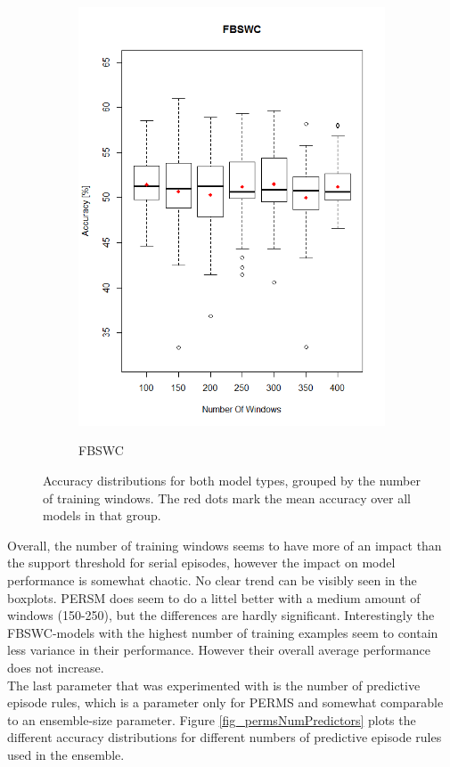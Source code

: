 \begin{figure}[h]
\begin{subfigure}{.5\textwidth}
  \includegraphics[width=\linewidth]{fbswcNumWindows}
  \label{fig_fbswcSupportSerial}
  \caption{FBSWC}
\end{subfigure}
\caption{Accuracy distributions for both model types, grouped by the number of training windows. The red dots mark the mean accuracy over all models in that group.}
\label{fig_numWindowsBoxplots}
\end{figure}

Overall, the number of training windows seems to have more of an impact than the support threshold for serial episodes, however the impact on model performance is somewhat chaotic. No clear trend can be visibly seen in the boxplots. PERSM does seem to do a littel better with a medium amount of windows (150-250), but the differences are hardly significant. Interestingly the FBSWC-models with the highest number of training examples seem to contain less variance in their performance. However their overall average performance does not increase. \\
The last parameter that was experimented with is the number of predictive episode rules, which is a parameter only for PERMS and somewhat comparable to an ensemble-size parameter. Figure \ref{fig_permsNumPredictors} plots the different accuracy distributions for different numbers of predictive episode rules used in the ensemble.

